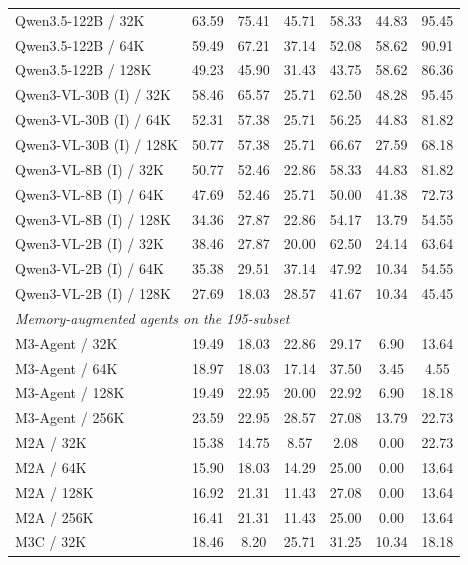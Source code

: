 \documentclass{article}
\begin{document}
\begin{table}[h]
\begin{tabular}{@{}lcccccc@{}}
\midrule
Qwen3.5-122B / 32K        & 63.59 & 75.41 & 45.71 & 58.33 & 44.83 &  95.45 \\
Qwen3.5-122B / 64K        & 59.49 & 67.21 & 37.14 & 52.08 & 58.62 &  90.91 \\
Qwen3.5-122B / 128K       & 49.23 & 45.90 & 31.43 & 43.75 & 58.62 &  86.36 \\
\midrule
Qwen3-VL-30B (I) / 32K    & 58.46 & 65.57 & 25.71 & 62.50 & 48.28 &  95.45 \\
Qwen3-VL-30B (I) / 64K    & 52.31 & 57.38 & 25.71 & 56.25 & 44.83 &  81.82 \\
Qwen3-VL-30B (I) / 128K   & 50.77 & 57.38 & 25.71 & 66.67 & 27.59 &  68.18 \\
Qwen3-VL-8B (I) / 32K     & 50.77 & 52.46 & 22.86 & 58.33 & 44.83 &  81.82 \\
Qwen3-VL-8B (I) / 64K     & 47.69 & 52.46 & 25.71 & 50.00 & 41.38 &  72.73 \\
Qwen3-VL-8B (I) / 128K    & 34.36 & 27.87 & 22.86 & 54.17 & 13.79 &  54.55 \\
Qwen3-VL-2B (I) / 32K     & 38.46 & 27.87 & 20.00 & 62.50 & 24.14 &  63.64 \\
Qwen3-VL-2B (I) / 64K     & 35.38 & 29.51 & 37.14 & 47.92 & 10.34 &  54.55 \\
Qwen3-VL-2B (I) / 128K    & 27.69 & 18.03 & 28.57 & 41.67 & 10.34 &  45.45 \\
\midrule
\multicolumn{7}{l}{\emph{Memory-augmented agents on the 195-subset}} \\
M3-Agent / 32K            & 19.49 & 18.03 & 22.86 & 29.17 &  6.90 & 13.64 \\
M3-Agent / 64K            & 18.97 & 18.03 & 17.14 & 37.50 &  3.45 &  4.55 \\
M3-Agent / 128K           & 19.49 & 22.95 & 20.00 & 22.92 &  6.90 & 18.18 \\
M3-Agent / 256K           & 23.59 & 22.95 & 28.57 & 27.08 & 13.79 & 22.73 \\
M2A / 32K                 & 15.38 & 14.75 &  8.57 &  2.08 &  0.00 & 22.73 \\
M2A / 64K                 & 15.90 & 18.03 & 14.29 & 25.00 &  0.00 & 13.64 \\
M2A / 128K                & 16.92 & 21.31 & 11.43 & 27.08 &  0.00 & 13.64 \\
M2A / 256K                & 16.41 & 21.31 & 11.43 & 25.00 &  0.00 & 13.64 \\
M3C / 32K                 & 18.46 &  8.20 & 25.71 & 31.25 & 10.34 & 18.18 \\

\end{tabular}
\end{table}
\end{document}
